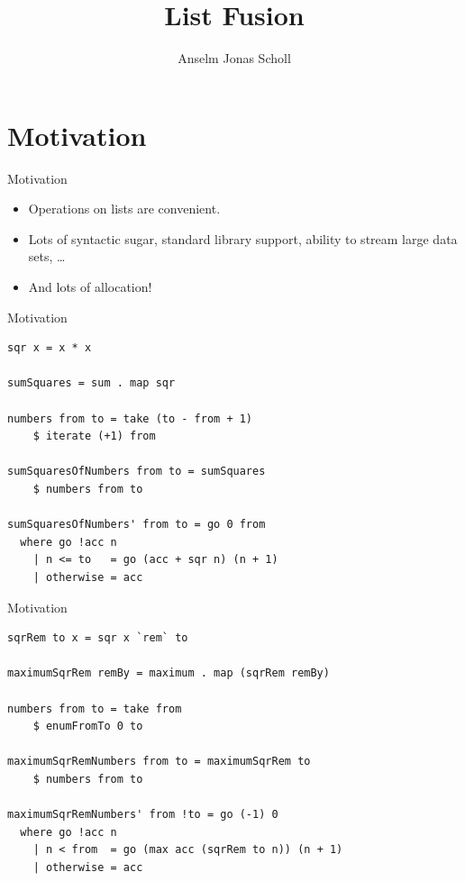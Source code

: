 \documentclass[11pt]{beamer}
\author{Anselm Jonas Scholl}
\title{List Fusion}
\institute{Hamburg Haskell Meetup}
\begin{document}
\begin{frame}
\titlepage
\end{frame}

\begin{frame}
\tableofcontents
\end{frame}

\section{Motivation}

\begin{frame}[fragile]{Motivation}
	\begin{itemize}
		\item Operations on lists are convenient.
		\item Lots of syntactic sugar, standard library support, ability to stream large data sets, \dots
		\item And lots of allocation!
	\end{itemize}
\end{frame}

\begin{frame}[fragile]{Motivation}
\begin{verbatim}
sqr x = x * x

sumSquares = sum . map sqr

numbers from to = take (to - from + 1)
    $ iterate (+1) from

sumSquaresOfNumbers from to = sumSquares
    $ numbers from to

sumSquaresOfNumbers' from to = go 0 from
  where go !acc n
    | n <= to   = go (acc + sqr n) (n + 1)
    | otherwise = acc
\end{verbatim}
\end{frame}

\begin{frame}[fragile]{Motivation}
\begin{verbatim}
sqrRem to x = sqr x `rem` to

maximumSqrRem remBy = maximum . map (sqrRem remBy)

numbers from to = take from
    $ enumFromTo 0 to

maximumSqrRemNumbers from to = maximumSqrRem to
    $ numbers from to

maximumSqrRemNumbers' from !to = go (-1) 0
  where go !acc n
    | n < from  = go (max acc (sqrRem to n)) (n + 1)
    | otherwise = acc
\end{verbatim}

\end{frame}
\end{document}
